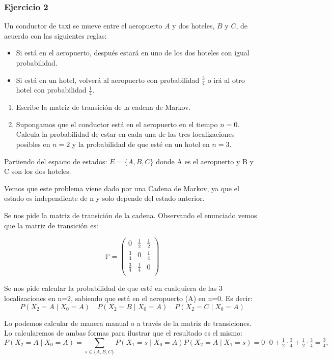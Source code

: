 \subsubsection{Ejercicio 2}
\begin{exercise}
Un conductor de taxi se mueve entre el aeropuerto $A$ y dos hoteles, $B$ y $C$, de acuerdo con las siguientes reglas:

\begin{itemize}
    \item Si está en el aeropuerto, después estará en uno de los dos hoteles con igual probabilidad.
    \item Si está en un hotel, volverá al aeropuerto con probabilidad $\frac{3}{4}$ o irá al otro hotel con probabilidad $\frac{1}{4}$.
\end{itemize}

\begin{enumerate}
    \item Escribe la matriz de transición de la cadena de Markov.
    \item Supongamos que el conductor está en el aeropuerto en el tiempo $n=0$. Calcula la probabilidad de estar en cada una de las tres localizaciones posibles en $n=2$ y la probabilidad de que esté en un hotel en $n=3$.
\end{enumerate}
\end{exercise}


Partiendo del espacio de estados: $E=\{A,B,C\}$ donde A es el aeropuerto y B y C son los dos hoteles.

Vemos que este problema viene dado por una Cadena de Markov, ya que el estado es independiente de n y solo depende del estado anterior.

Se nos pide la matriz de transición de la cadena. Observando el enunciado vemos que la matriz de transición es:

\[
\mathbb{P} =
\begin{pmatrix}
    0 & \frac{1}{2} & \frac{1}{2}\\
    \frac{3}{4} & 0 & \frac{1}{4} \\
    \frac{3}{4} & \frac{1}{4} & 0\\
\end{pmatrix}
\]

Se nos pide calcular la probabilidad de que esté en cualquiera de las 3 localizaciones en n=2, sabiendo que está en el aeropuerto (A) en n=0.
Es decir:
\[
P(X_2=A \mid X_0=A) \quad P(X_2=B \mid X_0=A) \quad P(X_2=C \mid X_0=A)
\]

Lo podemos calcular de manera manual o a través de la matriz de transiciones. Lo calcularemos de ambas formas para ilustrar que el resultado es el mismo:
\[
P(X_2=A\mid X_0=A)=\sum_{s\in\{A,B,C\}} P(X_1=s\mid X_0=A)P(X_2=A\mid X_1=s)
=0\cdot0+\tfrac12\cdot\tfrac34+\tfrac12\cdot\tfrac34=\tfrac34,
\]

